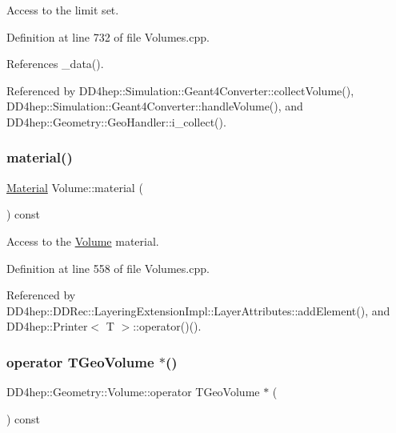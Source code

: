 Access to the limit set. 



Definition at line 732 of file Volumes.\+cpp.



References \+\_\+data().



Referenced by D\+D4hep\+::\+Simulation\+::\+Geant4\+Converter\+::collect\+Volume(), D\+D4hep\+::\+Simulation\+::\+Geant4\+Converter\+::handle\+Volume(), and D\+D4hep\+::\+Geometry\+::\+Geo\+Handler\+::i\+\_\+collect().

\hypertarget{class_d_d4hep_1_1_geometry_1_1_volume_a4b2c5449e20041a2d917404c1353d355}{}\label{class_d_d4hep_1_1_geometry_1_1_volume_a4b2c5449e20041a2d917404c1353d355} 
\subsubsection{\texorpdfstring{material()}{material()}}
{\footnotesize\ttfamily \hyperlink{class_d_d4hep_1_1_geometry_1_1_material}{Material} Volume\+::material (\begin{DoxyParamCaption}{ }\end{DoxyParamCaption}) const}



Access to the \hyperlink{class_d_d4hep_1_1_geometry_1_1_volume}{Volume} material. 



Definition at line 558 of file Volumes.\+cpp.



Referenced by D\+D4hep\+::\+D\+D\+Rec\+::\+Layering\+Extension\+Impl\+::\+Layer\+Attributes\+::add\+Element(), and D\+D4hep\+::\+Printer$<$ T $>$\+::operator()().

\hypertarget{class_d_d4hep_1_1_geometry_1_1_volume_a6a5460b989e24aa70149574c437f48cd}{}\label{class_d_d4hep_1_1_geometry_1_1_volume_a6a5460b989e24aa70149574c437f48cd} 
\subsubsection{\texorpdfstring{operator T\+Geo\+Volume $\ast$()}{operator TGeoVolume *()}}
{\footnotesize\ttfamily D\+D4hep\+::\+Geometry\+::\+Volume\+::operator T\+Geo\+Volume $\ast$ (\begin{DoxyParamCaption}{ }\end{DoxyParamCaption}) const\hspace{0.3cm}{\ttfamily [inline]}}



